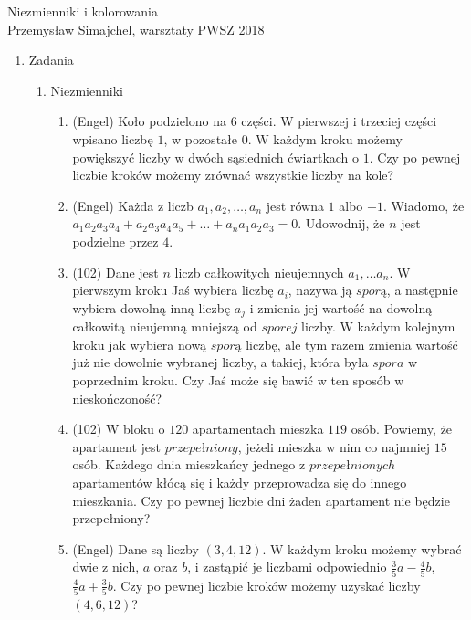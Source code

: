 \documentclass{article}
\begin{document}
{\begin{center}\LARGE Niezmienniki i kolorowania \\\large Przemysław Simajchel, warsztaty PWSZ 2018 \smallskip\end{center}}
	\begin{enumerate}
		\item {\large Zadania} 
		
		\begin{enumerate}[\roman*.]
			\item Niezmienniki
			
			\begin{enumerate}[1.]
				\item (Engel) Koło podzielono na $6$ części. W pierwszej i trzeciej części wpisano liczbę $1$, w pozostałe $0$. W każdym kroku możemy powiększyć liczby w dwóch sąsiednich ćwiartkach o $1$. Czy po pewnej liczbie kroków możemy zrównać wszystkie liczby na kole?
				
				\item (Engel) Każda z liczb $a_1, a_2, \ldots , a_n$ jest równa $1$ albo $-1$. Wiadomo, że $a_1 a_2 a_3 a_4 + a_2 a_3 a_4 a_5 + \ldots + a_n a_1 a_2 a_3 = 0$. Udowodnij, że $n$ jest podzielne przez $4$.
				
				\item (102) Dane jest $n$ liczb całkowitych nieujemnych $a_1, \ldots a_n$. W pierwszym kroku Jaś wybiera liczbę $a_i$, nazywa ją $sporą$, a następnie wybiera dowolną inną liczbę $a_j$ i zmienia jej wartość na dowolną całkowitą nieujemną mniejszą od $sporej$ liczby. W każdym kolejnym kroku jak wybiera nową $sporą$ liczbę, ale tym razem zmienia wartość już nie dowolnie wybranej liczby, a takiej, która była $spora$ w poprzednim kroku. Czy Jaś może się bawić w ten sposób w nieskończoność?
				
				\item (102) W bloku o $120$ apartamentach mieszka $119$ osób. Powiemy, że apartament jest $przepełniony$, jeżeli mieszka w nim co najmniej $15$ osób. Każdego dnia mieszkańcy jednego z $przepełnionych$ apartamentów kłócą się i każdy przeprowadza się do innego mieszkania. Czy po pewnej liczbie dni żaden apartament nie będzie przepełniony?
				
				\item (Engel) Dane są liczby $(3, 4, 12)$. W każdym kroku możemy wybrać dwie z nich, $a$ oraz $b$, i zastąpić je liczbami odpowiednio $\frac{3}{5}a - \frac{4}{5}b$, $\frac{4}{5}a + \frac{3}{5}b$. Czy po pewnej liczbie kroków możemy uzyskać liczby $(4, 6, 12)$?
				

\end{enumerate}
\end{enumerate}
\end{enumerate}
\end{document}

